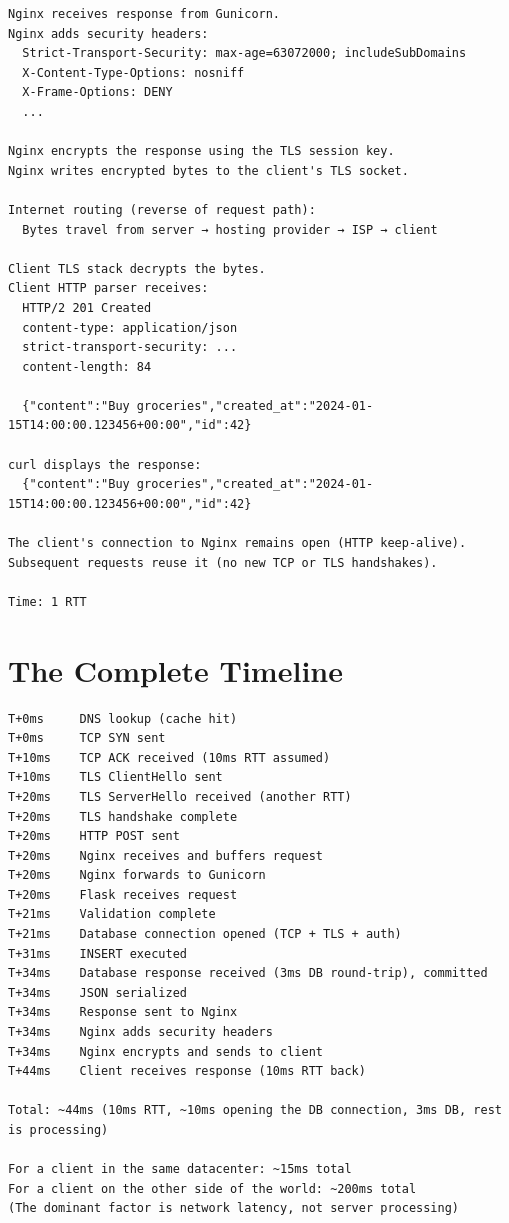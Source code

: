 \begin{outputbox}
\begin{Verbatim}[fontsize=\codesize, breaklines, breakanywhere, breaksymbolleft={\tiny\textcolor{muted}{$\hookrightarrow$}}]
Nginx receives response from Gunicorn.
Nginx adds security headers:
  Strict-Transport-Security: max-age=63072000; includeSubDomains
  X-Content-Type-Options: nosniff
  X-Frame-Options: DENY
  ...

Nginx encrypts the response using the TLS session key.
Nginx writes encrypted bytes to the client's TLS socket.

Internet routing (reverse of request path):
  Bytes travel from server → hosting provider → ISP → client

Client TLS stack decrypts the bytes.
Client HTTP parser receives:
  HTTP/2 201 Created
  content-type: application/json
  strict-transport-security: ...
  content-length: 84

  {"content":"Buy groceries","created_at":"2024-01-15T14:00:00.123456+00:00","id":42}

curl displays the response:
  {"content":"Buy groceries","created_at":"2024-01-15T14:00:00.123456+00:00","id":42}

The client's connection to Nginx remains open (HTTP keep-alive).
Subsequent requests reuse it (no new TCP or TLS handshakes).

Time: 1 RTT
\end{Verbatim}
\end{outputbox}

\setcounter{section}{10}
\section{The Complete Timeline}\label{29-client-server-journey:2911-the-complete-timeline}

\begin{outputbox}
\begin{Verbatim}[fontsize=\codesize, breaklines, breakanywhere, breaksymbolleft={\tiny\textcolor{muted}{$\hookrightarrow$}}]
T+0ms     DNS lookup (cache hit)
T+0ms     TCP SYN sent
T+10ms    TCP ACK received (10ms RTT assumed)
T+10ms    TLS ClientHello sent
T+20ms    TLS ServerHello received (another RTT)
T+20ms    TLS handshake complete
T+20ms    HTTP POST sent
T+20ms    Nginx receives and buffers request
T+20ms    Nginx forwards to Gunicorn
T+20ms    Flask receives request
T+21ms    Validation complete
T+21ms    Database connection opened (TCP + TLS + auth)
T+31ms    INSERT executed
T+34ms    Database response received (3ms DB round-trip), committed
T+34ms    JSON serialized
T+34ms    Response sent to Nginx
T+34ms    Nginx adds security headers
T+34ms    Nginx encrypts and sends to client
T+44ms    Client receives response (10ms RTT back)

Total: ~44ms (10ms RTT, ~10ms opening the DB connection, 3ms DB, rest is processing)

For a client in the same datacenter: ~15ms total
For a client on the other side of the world: ~200ms total
(The dominant factor is network latency, not server processing)
\end{Verbatim}
\end{outputbox}

